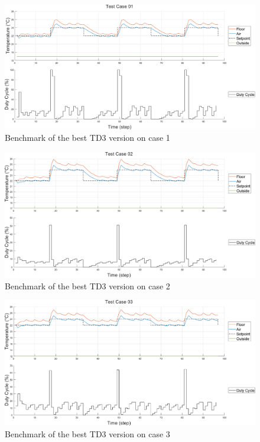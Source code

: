 \documentclass[../main.tex]{subfiles}
\begin{document}
\begin{figure}[htbp]
    \centering
    \includegraphics[width=1\linewidth]{figures/TestCase01.png}
    \caption{Benchmark of the best TD3 version on case 1}
    \label{fig:result1}
\end{figure}
\begin{figure}[htbp]
    \centering
    \includegraphics[width=1\linewidth]{figures/TestCase02.png}
    \caption{Benchmark of the best TD3 version on case 2}
    \label{fig:result2}
\end{figure}
\begin{figure}[htbp]
    \centering
    \includegraphics[width=1\linewidth]{figures/TestCase03.png}
    \caption{Benchmark of the best TD3 version on case 3}
    \label{fig:result3}
\end{figure}
\end{document}
